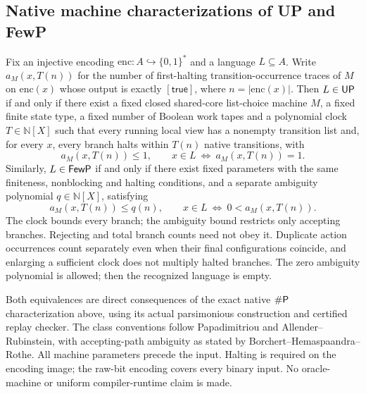 \begin{result}
\subsection{Native machine characterizations of UP and FewP}
Fix an injective encoding $\mathrm{enc}:A\hookrightarrow\{0,1\}^*$ and a
language $L\subseteq A$. Write $a_M(x,T(n))$ for the number of first-halting
transition-occurrence traces of $M$ on $\mathrm{enc}(x)$ whose output is exactly
$[\mathsf{true}]$, where $n=|\mathrm{enc}(x)|$.
Then $L\in\mathsf{UP}$ if and only if there exist a fixed closed shared-core
list-choice machine $M$, a fixed finite state type, a fixed number of Boolean
work tapes and a polynomial clock $T\in\mathbb N[X]$ such that every running
local view has a nonempty transition list and, for every $x$, every branch
halts within $T(n)$ native transitions, with
\[
 a_M(x,T(n))\le 1,\qquad
 x\in L\ \Longleftrightarrow\ a_M(x,T(n))=1.
\]
Similarly, $L\in\mathsf{FewP}$ if and only if there exist fixed parameters with the
same finiteness, nonblocking and halting conditions, and a separate ambiguity
polynomial $q\in\mathbb N[X]$, satisfying
\[
 a_M(x,T(n))\le q(n),\qquad
 x\in L\ \Longleftrightarrow\ 0<a_M(x,T(n)).
\]
The clock bounds every branch; the ambiguity bound restricts only accepting
branches. Rejecting and total branch counts need not obey it. Duplicate action
occurrences count separately even when their final configurations coincide,
and enlarging a sufficient clock does not multiply halted branches. The zero
ambiguity polynomial is allowed; then the recognized language is empty.

Both equivalences are direct consequences of the exact native $\#\mathsf{P}$
characterization above, using its actual parsimonious construction and certified
replay checker. The class conventions follow Papadimitriou and
Allender--Rubinstein, with accepting-path ambiguity as stated by
Borchert--Hemaspaandra--Rothe.\citep{Papadimitriou94,AllenderRubinstein1988}
\citep[Section 1]{BorchertHemaspaandraRothe2000}
All machine parameters precede the input. Halting is required on the encoding
image; the raw-bit encoding covers every binary input. No oracle-machine or
uniform compiler-runtime claim is made.
\end{result}

